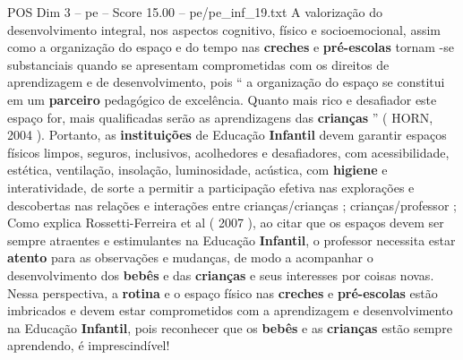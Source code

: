 \begin{textsample}{POS Dim 3 – pe – Score 15.00 – pe/pe\_inf\_19.txt}
A valorização do desenvolvimento integral, nos aspectos cognitivo, físico e socioemocional, assim como a organização do espaço e do tempo nas \textbf{creches} e \textbf{pré-escolas} tornam -se substanciais quando se apresentam comprometidas com os direitos de aprendizagem e de desenvolvimento, pois “ a organização do espaço se constitui em um \textbf{parceiro} pedagógico de excelência.
Quanto mais rico e desafiador este espaço for, mais qualificadas serão as aprendizagens das \textbf{crianças} ” ( HORN, 2004 ).
Portanto, as \textbf{instituições} de Educação \textbf{Infantil} devem garantir espaços físicos limpos, seguros, inclusivos, acolhedores e desafiadores, com acessibilidade, estética, ventilação, insolação, luminosidade, acústica, com \textbf{higiene} e interatividade, de sorte a permitir a participação efetiva nas explorações e descobertas nas relações e interações entre crianças/crianças ; crianças/professor ; Como explica Rossetti-Ferreira et al ( 2007 ), ao citar que os espaços devem ser sempre atraentes e estimulantes na Educação \textbf{Infantil}, o professor necessita estar \textbf{atento} para as observações e mudanças, de modo a acompanhar o desenvolvimento dos \textbf{bebês} e das \textbf{crianças} e seus interesses por coisas novas.
Nessa perspectiva, a \textbf{rotina} e o espaço físico nas \textbf{creches} e \textbf{pré-escolas} estão imbricados e devem estar comprometidos com a aprendizagem e desenvolvimento na Educação \textbf{Infantil}, pois reconhecer que os \textbf{bebês} e as \textbf{crianças} estão sempre aprendendo, é imprescindível!

\end{textsample}
